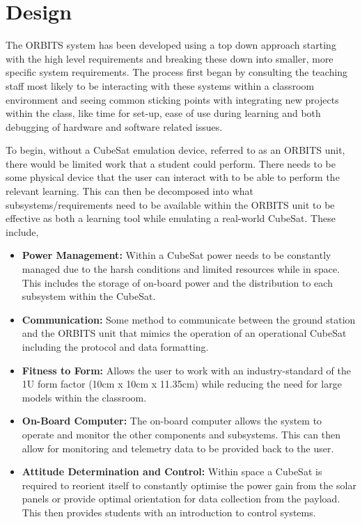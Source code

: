 \documentclass[a4paper,12pt,titlepage]{report}
\begin{document}
\chapter{Design}
The ORBITS system has been developed using a top down approach starting with the high level requirements and breaking these down into smaller, more specific system requirements. The process first began by consulting the teaching staff most likely to be interacting with these systems within a classroom environment and seeing common sticking points with integrating new projects within the class, like time for set-up, ease of use during learning and both debugging of hardware and software related issues.

To begin, without a CubeSat emulation device, referred to as an ORBITS unit, there would be limited work that a student could perform. There needs to be some physical device that the user can interact with to be able to perform the relevant learning. This can then be decomposed into what subsystems/requirements need to be available within the ORBITS unit to be effective as both a learning tool while emulating a real-world CubeSat. These include,
\begin{itemize}
    \item \textbf{Power Management:} Within a CubeSat power needs to be constantly managed due to the harsh conditions and limited resources while in space. This includes the storage of on-board power and the distribution to each subsystem within the CubeSat.
    \item \textbf{Communication:} Some method to communicate between the ground station and the ORBITS unit that mimics the operation of an operational CubeSat including the protocol and data formatting.
    \item \textbf{Fitness to Form:} Allows the user to work with an industry-standard of the 1U form factor (10cm x 10cm x 11.35cm) while reducing the need for large models within the classroom.
    \item \textbf{On-Board Computer:} The on-board computer allows the system to operate and monitor the other components and subsystems. This can then allow for monitoring and telemetry data to be provided back to the user.
    \item \textbf{Attitude Determination and Control:} Within space a CubeSat is required to reorient itself to constantly optimise the power gain from the solar panels or provide optimal orientation for data collection from the payload. This then provides students with an introduction to control systems.
\end{itemize}
\end{document}
